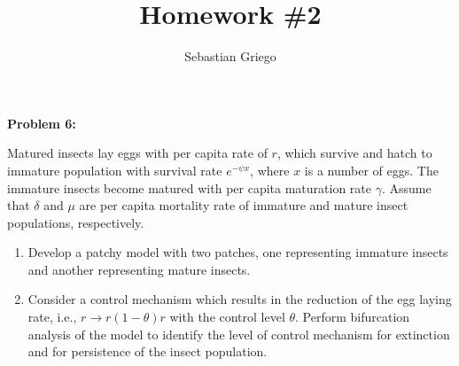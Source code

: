 \documentclass[12pt]{article}
\newenvironment{problem}[1]{
    \textbf{Problem #1:}
}{
    \rmfamily \vspace{1em}
}
\begin{document}
\title{Homework \#2}  %
\author{Sebastian Griego}  %

\begin{problem}{6}
    Matured insects lay eggs with per capita rate of \(r\), which survive and hatch to immature population with survival rate \(e^{-\psi x}\), where \(x\) is a number of eggs. The immature insects become matured with per capita maturation rate \(\gamma\). Assume that \(\delta\) and \(\mu\) are per capita mortality rate of immature and mature insect populations, respectively.
    \begin{enumerate}
        \item Develop a patchy model with two patches, one representing immature insects and another representing mature insects.
        \item Consider a control mechanism which results in the reduction of the egg laying rate, i.e., \(r \to r(1-\theta)r\) with the control level \(\theta\). Perform bifurcation analysis of the model to identify the level of control mechanism for extinction and for persistence of the insect population.
    \end{enumerate}
\end{problem}
\end{document}
